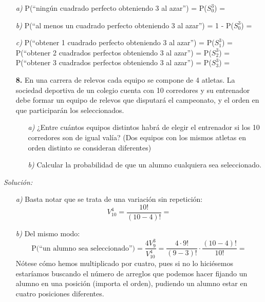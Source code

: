 \documentclass[11pt,a4paper]{article}
\theoremstyle{definition}
\begin{document}
	\begin{itemize}
		\item[\emph{a)}] P(``ningún cuadrado perfecto obteniendo 3 al azar'') = P($S^3_0$) = 
		\item[\emph{b)}] P(``al menos un cuadrado perfecto obteniendo 3 al azar'') = 1 - P($S^3_0$) = 
		\item[\emph{c)}] P(``obtener 1 cuadrado perfecto obteniendo 3 al azar'') = P($S^3_1$) = \\
		P(``obtener 2 cuadrados perfectos obteniendo 3 al azar'') = P($S^3_2$) = \\
		P(``obtener 3 cuadrados perfectos obteniendo 3 al azar'') = P($S^3_3$) = 
	\end{itemize}


\pagebreak

\begin{itemize}
	\item[\textbf{8.}] En una carrera de relevos cada equipo se compone de 4 atletas. La sociedad deportiva de un colegio cuenta con 10 corredores y su entrenador debe formar un equipo de relevos que disputará el campeonato, y el orden en que participarán los seleccionados.
	
	\begin{itemize}
		\item[\emph{a)}] ¿Entre cuántos equipos distintos habrá de elegir el entrenador si los 10 corredores son de igual valía? (Dos equipos con los mismos atletas en orden distinto se consideran diferentes)
		\item[\emph{b)}] Calcular la probabilidad de que un alumno cualquiera sea seleccionado.
	\end{itemize}
\end{itemize}

{\color{grey}\hrulefill}

\emph{Solución:}

\begin{itemize}
\item[\emph{a)}] Basta notar que se trata de una variación sin repetición:
$$ V^4_{10} = \frac{10!}{(10-4)!} = $$
		\item[\emph{b)}] Del mismo modo:
		$$ \text{P(``un alumno sea seleccionado'')} = \frac{4V^3_9}{V^4_{10}} = \frac{4 \cdot 9!}{(9-3)!} \cdot \frac{(10-4)!}{10!} = $$
		Nótese cómo hemos multiplicado por cuatro, pues si no lo hiciésemos estaríamos buscando el número de arreglos que podemos hacer fijando un alumno en una posición (importa el orden), pudiendo un alumno estar en cuatro posiciones diferentes.
	\end{itemize}
\end{document}
